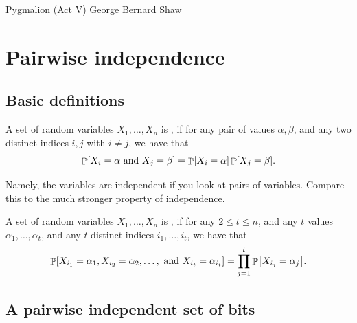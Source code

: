 %



\ChapterPrefix{}
\ChapterGen{}

%
{Pygmalion (Act V)}%
{George Bernard Shaw}


\section{Pairwise independence}

\subsection{Basic definitions}

\begin{defn}
    A set of random variables $X_1, \ldots, X_n$ is , if for any pair of
    values $\alpha, \beta$, and any two distinct indices $i,j$ with
    $i \neq j$, we have that
    \begin{equation*}
        \Prob{X_i =\alpha \text{ and } X_j = \beta}%
        =%
        \Prob{X_i =\alpha} \Prob{ X_j = \beta}.
    \end{equation*}
\end{defn}

Namely, the variables are independent if you look at pairs of
variables. Compare this to the much stronger property of independence.
\begin{defn}
    A set of random variables $X_1, \ldots, X_n$ is
    , if for any
    $2 \leq t \leq n$, and any $t$ values $\alpha_1, \ldots, \alpha_t$, and any
    $t$ distinct indices $i_1,\ldots, i_t$, we have that
    \begin{equation*}
        \Prob{X_{i_1} =\alpha_1, X_{i_2} =\alpha_2,\ldots,
           \text{ and } X_{i_t} = \alpha_{i_t}}%
        =%
        \prod_{j=1}^t
        \Prob{X_{i_j} =\alpha_j}.
    \end{equation*}
\end{defn}


\subsection{A pairwise independent set of bits}
%


